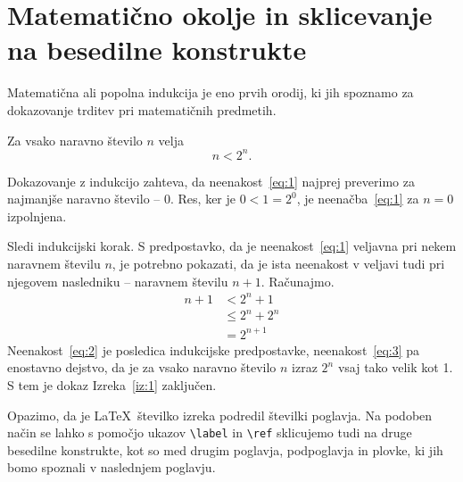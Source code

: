 \chapter{Matematično okolje in sklicevanje na besedilne konstrukte}

Matematična ali popolna indukcija je eno prvih orodij, ki jih spoznamo za dokazovanje trditev pri
matematičnih predmetih.
\begin{izrek}
    \label{iz:1}
    Za vsako naravno število $n$ velja
    \begin{equation}
        n < 2^n.
        \label{eq:1}
    \end{equation}
\end{izrek}
\begin{dokaz}
    Dokazovanje z indukcijo zahteva, da neenakost~\eqref{eq:1} najprej preverimo za najmanjše
    naravno število -- $0$.
    Res, ker je $0 < 1 = 2^0$, je neenačba~\eqref{eq:1} za $n=0$ izpolnjena.

    Sledi indukcijski korak. S predpostavko, da je neenakost~\eqref{eq:1} veljavna pri nekem
    naravnem številu $n$, je potrebno pokazati, da je ista neenakost v veljavi tudi pri njegovem
    nasledniku -- naravnem številu $n+1$.
    Računajmo.
    \begin{align}
        n+1 & < 2^n + 1       \label{eq:2} \\
            & \le 2^n + 2^n \label{eq:3}   \\
            & = 2^{n+1}       \nonumber
    \end{align}
    Neenakost~\eqref{eq:2} je posledica indukcijske predpostavke, neenakost~\eqref{eq:3} pa
    enostavno dejstvo, da je za vsako naravno število $n$ izraz $2^n$ vsaj tako velik kot 1.
    S tem je dokaz Izreka~\ref{iz:1} zaključen.
\end{dokaz}

Opazimo, da je \LaTeX\ številko izreka podredil številki poglavja.
Na podoben način se lahko s pomočjo ukazov \verb|\label| in \verb|\ref| sklicujemo tudi na druge
besedilne konstrukte, kot so med drugim poglavja, podpoglavja in plovke, ki jih bomo spoznali v
naslednjem poglavju.
